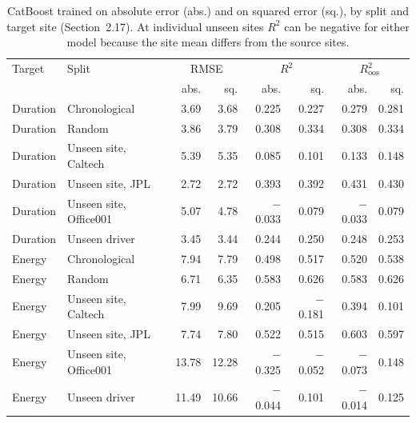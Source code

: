 \begin{table}[H]\centering\footnotesize
\caption{CatBoost trained on absolute error (abs.) and on squared error (sq.), by split and target site (Section~2.17). At individual unseen sites $R^2$ can be negative for either model because the site mean differs from the source sites.}\label{tab:s-sq}
\begin{tabular}{llrrrrrr}\toprule
Target & Split & \multicolumn{2}{c}{RMSE} & \multicolumn{2}{c}{$R^2$} & \multicolumn{2}{c}{$R^2_{\text{oos}}$} \\ & & abs. & sq. & abs. & sq. & abs. & sq. \\\midrule
Duration & Chronological & 3.69 & 3.68 & 0.225 & 0.227 & 0.279 & 0.281 \\
Duration & Random & 3.86 & 3.79 & 0.308 & 0.334 & 0.308 & 0.334 \\
Duration & Unseen site, Caltech & 5.39 & 5.35 & 0.085 & 0.101 & 0.133 & 0.148 \\
Duration & Unseen site, JPL & 2.72 & 2.72 & 0.393 & 0.392 & 0.431 & 0.430 \\
Duration & Unseen site, Office001 & 5.07 & 4.78 & $-$0.033 & 0.079 & $-$0.033 & 0.079 \\
Duration & Unseen driver & 3.45 & 3.44 & 0.244 & 0.250 & 0.248 & 0.253 \\
Energy & Chronological & 7.94 & 7.79 & 0.498 & 0.517 & 0.520 & 0.538 \\
Energy & Random & 6.71 & 6.35 & 0.583 & 0.626 & 0.583 & 0.626 \\
Energy & Unseen site, Caltech & 7.99 & 9.69 & 0.205 & $-$0.181 & 0.394 & 0.101 \\
Energy & Unseen site, JPL & 7.74 & 7.80 & 0.522 & 0.515 & 0.603 & 0.597 \\
Energy & Unseen site, Office001 & 13.78 & 12.28 & $-$0.325 & $-$0.052 & $-$0.073 & 0.148 \\
Energy & Unseen driver & 11.49 & 10.66 & $-$0.044 & 0.101 & $-$0.014 & 0.125 \\
\bottomrule\end{tabular}\end{table}

